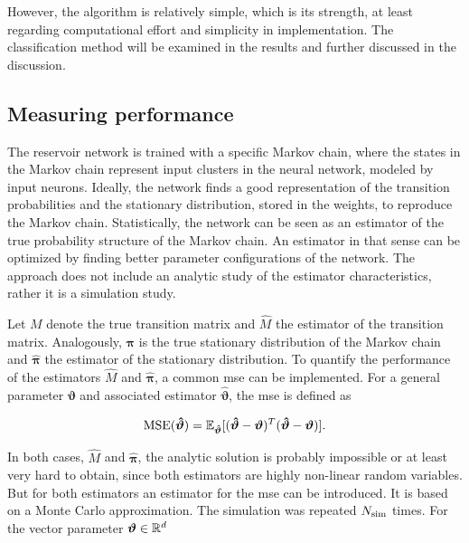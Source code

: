 However, the algorithm is relatively simple, which is its strength, at least regarding computational effort and simplicity in implementation. The classification method will be examined in the results and further discussed in the discussion.

\subsection{Measuring performance}

The reservoir network is trained with a specific Markov chain, where the states in the Markov chain represent input clusters in the neural network, modeled by input neurons. Ideally, the network finds a good representation of the transition probabilities and the stationary distribution, stored in the weights, to reproduce the Markov chain. Statistically, the network can be seen as an estimator of the true probability structure of the Markov chain. An estimator in that sense can be optimized by finding better parameter configurations of the network. The approach does not include an analytic study of the estimator characteristics, rather it is a simulation study.


Let $M$ denote the true transition matrix and $\hat M$ the estimator of the transition matrix. Analogously, $\bm\pi$ is the true stationary distribution of the Markov chain and $\bm{\hat\pi}$ the estimator of the stationary distribution. To quantify the performance of the estimators $\hat M$ and $\bm{\hat\pi}$, a common \acf{mse} can be implemented. For a general parameter $\bm\vartheta$ and associated estimator $\hat{\bm\vartheta}$, the \ac{mse} is defined as

\begin{equation}
\label{eq:mse}
\text{MSE}(\bm{\hat\vartheta}) = \mathbb{E}_{\bm{\hat\vartheta}}[(\bm{\hat\vartheta} - \bm\vartheta)^T (\bm{\hat\vartheta} - \bm\vartheta)].
\end{equation}

In both cases, $\hat M$ and $\bm{\hat\pi}$, the analytic solution is probably impossible or at least very hard to obtain, since both estimators are highly non-linear random variables. But for both estimators an estimator for the \ac{mse} can be introduced. It is based on a Monte Carlo approximation. The simulation was repeated $N_{\text{sim}}$ times. For the vector parameter $\bm\vartheta \in \mathbb{R}^d$

